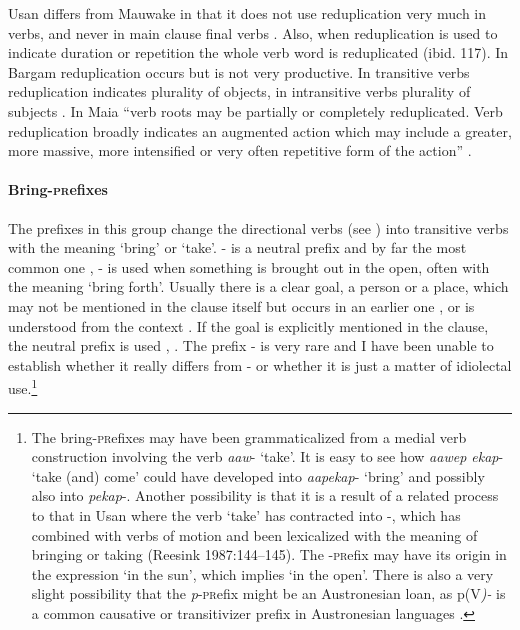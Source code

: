Usan differs from Mauwake in that it does not use reduplication very much in verbs, and never in main clause final verbs \citep[116]{Reesink1987}. Also, when reduplication is used to indicate duration or repetition the whole verb word is reduplicated (ibid. 117). In Bargam reduplication occurs but is not very productive. In transitive verbs reduplication indicates plurality of objects, in intransitive verbs plurality of subjects \citep[19]{Hepner2002}. In Maia ``{verb roots may be partially or completely reduplicated. Verb reduplication broadly indicates an augmented action which may include a greater, more massive, more intensified or very often repetitive form of the action}'' \citep[50]{Hardin2002}.

\paragraph{Bring-\textsc{pr}efixes}\label{sec:3:a:z:y:x}
{}
The prefixes in this group change the directional verbs (see ) into transitive verbs with the meaning `bring' or `take'. \nobreakdash- is a neutral prefix and by far the most common one , \nobreakdash- is used when something is brought out in the open, often with the meaning `bring forth'. Usually there is a clear goal, a person or a place, which may not be mentioned in the clause itself but occurs in an earlier one , or is understood from the context . If the goal is explicitly mentioned in the clause, the neutral prefix is used , . The prefix \nobreakdash-  is very rare and I have been unable to establish whether it really differs from \nobreakdash- or whether it is just a matter of idiolectal use.\footnote{The bring\nobreakdash-\textsc{pr}efixes may have been grammaticalized from a medial verb construction involving the verb \textit{aaw}\nobreakdash- `take'. It is easy to see how \textit{aawep ekap}\nobreakdash- `take (and) come' could have developed into \textit{aapekap}\nobreakdash- `bring' and possibly also into \textit{pekap}-. Another possibility is that it is a result of a related process to that in Usan where the verb  `take' has contracted into \nobreakdash-, which has combined with verbs of motion and been lexicalized with the meaning of bringing or taking ({Reesink 1987}:144--145). The \nobreakdash-\textsc{pr}efix may have its origin in the expression  `in the sun', which implies `in the open'. There is also a very slight possibility that the \textit{p}\nobreakdash-\textsc{pr}efix might be an Austronesian loan, as p(V\textit{)\nobreakdash-} is a common causative or transitivizer prefix in Austronesian languages \citep[61]{Bugenhagen1995}. }

